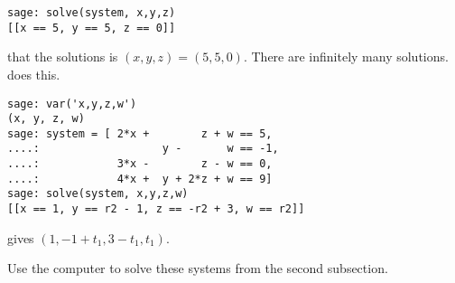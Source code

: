 \begin{exercises}
\begin{answer}
\begin{exparts}
\begin{lstlisting}
sage: solve(system, x,y,z)
[[x == 5, y == 5, z == 0]]          
\end{lstlisting}
           that the solutions is \( (x,y,z)=(5,5,0) \).
        \partsitem There are infinitely many solutions.
           \Sage{} does this.
\begin{lstlisting}
sage: var('x,y,z,w')
(x, y, z, w)
sage: system = [ 2*x +        z + w == 5,
....:                   y -       w == -1,
....:            3*x -        z - w == 0,
....:            4*x +  y + 2*z + w == 9]
sage: solve(system, x,y,z,w)
[[x == 1, y == r2 - 1, z == -r2 + 3, w == r2]]          
\end{lstlisting}
           \Maple{} gives $(1, -1+t_1, 3-t_1, t_1)$.
      \end{exparts}
    \end{answer}
  \item 
    Use the computer to solve these systems from the second subsection.
\end{exercises}
